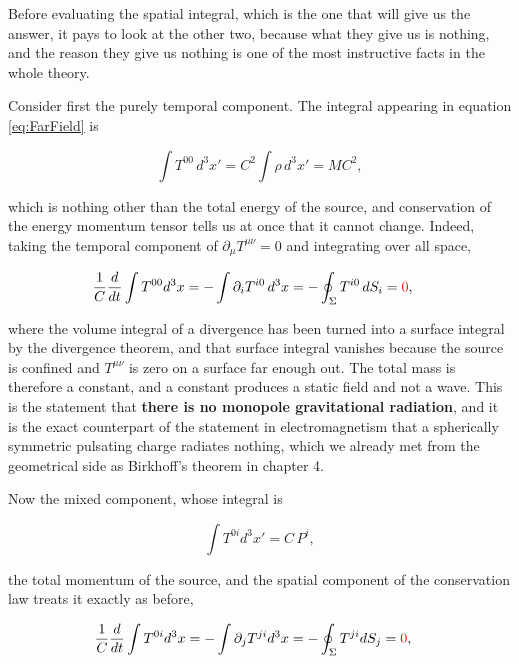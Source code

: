         Before evaluating the spatial integral, which is the one that will give us the answer, it pays to look at the other two, because what they give us is nothing, and the reason they give us nothing is one of the most instructive facts in the whole theory.

        Consider first the purely temporal component. The integral appearing in equation \ref{eq:FarField} is

        \begin{equation}
            \int T^{00}\,d^3x' = C^2\int\rho\, d^3x' = MC^2,
        \end{equation}

        which is nothing other than the total energy of the source, and conservation of the energy momentum tensor tells us at once that it cannot change. Indeed, taking the temporal component of $\partial_{\mu}T^{\mu\nu}=0$ and integrating over all space,

        \begin{align*}
            \frac{1}{C}\frac{d}{dt}\int T^{00}d^3x &= -\int \partial_iT^{i0}\,d^3x = -\oint_{\Sigma} T^{i0}\,dS_i = {\color{red}0},
        \end{align*}

        where the volume integral of a divergence has been turned into a surface integral by the divergence theorem, and that surface integral vanishes because the source is confined and $T^{\mu\nu}$ is zero on a surface far enough out. The total mass is therefore a constant, and a constant produces a static field and not a wave. This is the statement that \textbf{there is no monopole gravitational radiation}, and it is the exact counterpart of the statement in electromagnetism that a spherically symmetric pulsating charge radiates nothing, which we already met from the geometrical side as Birkhoff's theorem in chapter 4.

        Now the mixed component, whose integral is

        \begin{equation}
            \int T^{0i}d^3x' = C\,P^i,
        \end{equation}

        the total momentum of the source, and the spatial component of the conservation law treats it exactly as before,

        \begin{align*}
            \frac{1}{C}\frac{d}{dt}\int T^{0i}d^3x &= -\int\partial_jT^{ji}d^3x = -\oint_{\Sigma}T^{ji}dS_j = {\color{red}0},
        \end{align*}


